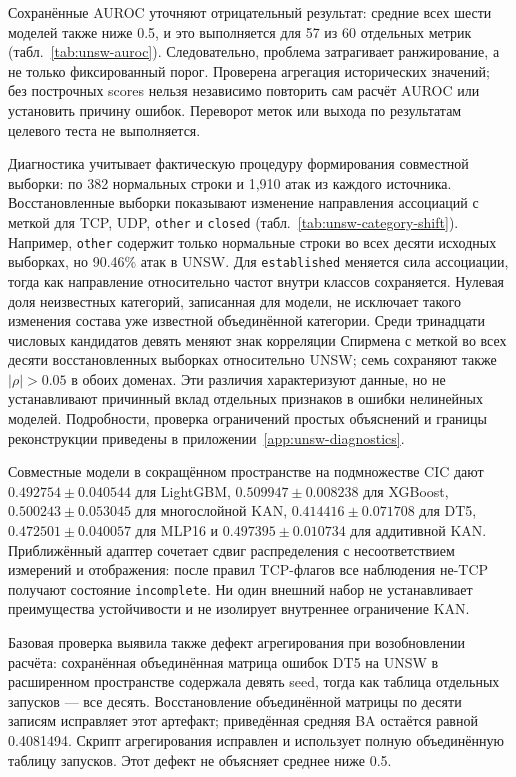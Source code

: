Сохранённые AUROC уточняют отрицательный результат: средние всех шести моделей также ниже 0.5, и это выполняется для 57 из 60 отдельных метрик (табл.~\ref{tab:unsw-auroc}). Следовательно, проблема затрагивает ранжирование, а не только фиксированный порог. Проверена агрегация исторических значений; без построчных scores нельзя независимо повторить сам расчёт AUROC или установить причину ошибок. Переворот меток или выхода по результатам целевого теста не выполняется.


Диагностика учитывает фактическую процедуру формирования совместной выборки: по 382 нормальных строки и 1,910 атак из каждого источника. Восстановленные выборки показывают изменение направления ассоциаций с меткой для TCP, UDP, \texttt{other} и \texttt{closed} (табл.~\ref{tab:unsw-category-shift}). Например, \texttt{other} содержит только нормальные строки во всех десяти исходных выборках, но 90.46\% атак в UNSW. Для \texttt{established} меняется сила ассоциации, тогда как направление относительно частот внутри классов сохраняется. Нулевая доля неизвестных категорий, записанная для модели, не исключает такого изменения состава уже известной объединённой категории. Среди тринадцати числовых кандидатов девять меняют знак корреляции Спирмена с меткой во всех десяти восстановленных выборках относительно UNSW; семь сохраняют также $|\rho|>0.05$ в обоих доменах. Эти различия характеризуют данные, но не устанавливают причинный вклад отдельных признаков в ошибки нелинейных моделей. Подробности, проверка ограничений простых объяснений и границы реконструкции приведены в приложении~\ref{app:unsw-diagnostics}.

Совместные модели в сокращённом пространстве на подмножестве CIC дают $0.492754\pm0.040544$ для LightGBM, $0.509947\pm0.008238$ для XGBoost, $0.500243\pm0.053045$ для многослойной KAN, $0.414416\pm0.071708$ для DT5, $0.472501\pm0.040057$ для MLP16 и $0.497395\pm0.010734$ для аддитивной KAN. Приближённый адаптер сочетает сдвиг распределения с несоответствием измерений и отображения: после правил TCP-флагов все наблюдения не-TCP получают состояние \texttt{incomplete}. Ни один внешний набор не устанавливает преимущества устойчивости и не изолирует внутреннее ограничение KAN.

Базовая проверка выявила также дефект агрегирования при возобновлении расчёта: сохранённая объединённая матрица ошибок DT5 на UNSW в расширенном пространстве содержала девять seed, тогда как таблица отдельных запусков --- все десять. Восстановление объединённой матрицы по десяти записям исправляет этот артефакт; приведённая средняя BA остаётся равной 0.4081494. Скрипт агрегирования исправлен и использует полную объединённую таблицу запусков. Этот дефект не объясняет среднее ниже 0.5.

